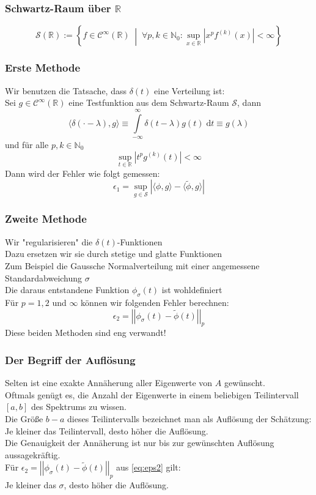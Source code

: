\documentclass{beamer}
\newcommand{\dt}{\;\mathrm{d}t}
\newcommand{\Cinfty}{\mathcal{C}^{\infty}}
\newcommand{\N}{\mathbb{N}}
\newcommand{\R}{\mathbb{R}}
\newcommand{\SR}{\mathcal{S}}
\renewcommand{\mid}{\;\middle|\;}
\begin{document}
\begin{frame}
    \frametitle{Schwartz-Raum über $\R$}
    $$\SR(\R) := \left\{f \in \Cinfty(\R) \mid \forall p, k \in \N_0: \sup_{x \in \R} \left| x^pf^{(k)}(x)\right| < \infty \right\}$$
\end{frame}

\begin{frame}
    \frametitle{Erste Methode}
    Wir benutzen die Tatsache, dass $\delta(t)$ eine Verteilung ist:\\
    Sei $g \in \Cinfty(\R)$ eine Testfunktion aus dem Schwartz-Raum $\SR$, dann
    $$\langle \delta(\cdot - \lambda), g \rangle \equiv \int\limits_{-\infty}^{\infty} \delta(t - \lambda) g(t) \dt \equiv g(\lambda)$$
    und für alle $p, k \in \N_0$ $$\sup_{t \in \R} |t^pg^{(k)}(t)| < \infty$$
    Dann wird der Fehler wie folgt gemessen: $$\epsilon_1 = \sup_{g \in \SR} \left| \langle \phi, g \rangle - \langle \tilde{\phi}, g \rangle \right|$$
\end{frame}

\begin{frame}
    \frametitle{Zweite Methode}
    Wir "regularisieren" die $\delta(t)$-Funktionen\\
    Dazu ersetzen wir sie durch stetige und glatte Funktionen\\
    Zum Beispiel die Gaussche Normalverteilung mit einer angemessene Standardabweichung $\sigma$\\
    Die daraus entstandene Funktion $\phi_{\sigma}(t)$ ist wohldefiniert\\
    Für $p=1, 2$ und $\infty$ können wir folgenden Fehler berechnen:
    \begin{equation} \label{eq:eps2}
        \epsilon_2 = \left|\left| \phi_{\sigma}(t) - \tilde{\phi}(t) \right|\right|_p
    \end{equation}
    Diese beiden Methoden sind eng verwandt!
\end{frame}

\begin{frame}
    \frametitle{Der Begriff der Auflösung}
    Selten ist eine exakte Annäherung aller Eigenwerte von $A$ gewünscht.\\
    Oftmals genügt es, die Anzahl der Eigenwerte in einem beliebigen Teilintervall $[a, b]$ des Spektrums zu wissen.\\
    Die Größe $b - a$ dieses Teilintervalls bezeichnet man als Auflösung der Schätzung:\\
    Je kleiner das Teilintervall, desto höher die Auflösung.\\
    Die Genauigkeit der Annäherung ist nur bis zur gewünschten Auflösung aussagekräftig.\\
    Für $\epsilon_2 = \left|\left| \phi_{\sigma}(t) - \tilde{\phi}(t) \right|\right|_p$ aus \eqref{eq:eps2} gilt:\\
    Je kleiner das $\sigma$, desto höher die Auflösung.
\end{frame}
\end{document}
